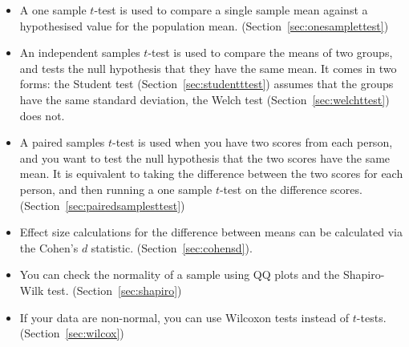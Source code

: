 \begin{itemize} \itemsep -2pt
\item A one sample $t$-test is used to compare a single sample mean against a hypothesised value for the population mean. (Section~\ref{sec:onesamplettest})
\item An independent samples $t$-test is used to compare the means of two groups, and tests the null hypothesis that they have the same mean. It comes in two forms: the Student test (Section~\ref{sec:studentttest}) assumes that the groups have the same standard deviation, the Welch test (Section~\ref{sec:welchttest}) does not.
\item A paired samples $t$-test is used when you have two scores from each person, and you want to test the null hypothesis that the two scores have the same mean. It is equivalent to taking the difference between the two scores for each person, and then running a one sample $t$-test on the difference scores. (Section~\ref{sec:pairedsamplesttest})
\item Effect size calculations for the difference between means can be calculated via the Cohen's $d$ statistic. (Section~\ref{sec:cohensd}).
\item You can check the normality of a sample using QQ plots and the Shapiro-Wilk test. (Section~\ref{sec:shapiro})
\item If your data are non-normal, you can use Wilcoxon tests instead of $t$-tests. (Section~\ref{sec:wilcox})
\end{itemize}


